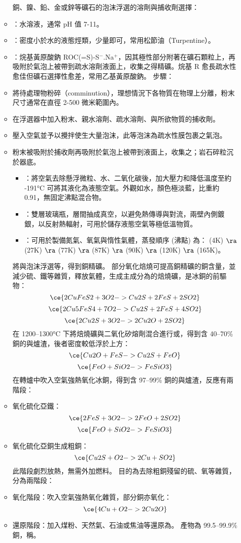 \documentclass[a4paper,12pt]{report}
\begin{document}
\begin{itemize}
\begin{itemize}
銅、鎳、鉛、金或鋅等礦石的泡沫浮選的溶劑與捕收劑選擇：
\bit
\item {}：水溶液，通常 pH 值 7-11。
\item {}：密度小於水的液態烴類，少量即可，常用松節油（Turpentine）。
\item {}：烷基黃原酸鈉 ROC(=S)-S$^-$.Na$^+$，因其極性部分附著在礦石顆粒上，再吸附於氣泡上被帶到疏水溶劑液面上，收集之得精礦。烷基 R 愈長疏水性愈佳但礦石選擇性愈差，常用乙基黃原酸鈉。
\eit
步驟：
\ben
\item 將待處理物粉碎（comminution），理想情況下各物質在物理上分離，粉末尺寸通常在直徑 2-500 微米範圍內。
\item 在浮選器中加入粉末、親水溶劑、疏水溶劑、與所欲物質的捕收劑。
\item 壓入空氣並予以攪拌使生大量泡沫，此等泡沫為疏水性膜包裹之氣泡。
\item 粉末被吸附於捕收劑再吸附於氣泡上被帶到液面上，收集之；岩石碎粒沉於器底。
\een
{}
\begin{itemize}
\item {}：將空氣去除懸浮微粒、水、二氧化碳後，加大壓力和降低溫度至約 -191°C 可將其液化為液態空氣。外觀如水，顏色極淡藍，比重約 0.91，無固定沸點混合物。
\item {}：雙層玻璃瓶，層間抽成真空，以避免熱傳導與對流，兩壁內側鍍銀，以反射熱輻射，可用於儲存液態空氣等極低溫物質。
\item {}：可用於製備氮氣、氧氣與惰性氣體，蒸發順序 (沸點) 為： (4K) $\ra$ (27K) $\ra$ (77K) $\ra$ (87K) $\ra$ (90K) $\ra$ (120K) $\ra$ (165K)。
\end{itemize}
將與泡沫浮選等，得到銅精礦。
部分氧化焙燒可提高銅精礦的銅含量，並減少硫、鐵等雜質，釋放氣體，生成主成分為的焙燒礦，是冰銅的前驅物：
\[\ce{2CuFeS2 + 3O2 -> Cu2S + 2FeS + 2SO2}\]
\[\ce{2Cu5FeS4 + 7O2 -> Cu2S + 2FeS + 4SO2}\]
\[\ce{2Cu2S + 3O2 -> 2Cu2O + 2SO2}\]
在 1200–1300°C 下將焙燒礦與二氧化矽熔劑混合進行或，得到含 40–70\% 銅的與爐渣，後者密度較低浮於上方：
\[\ce{Cu2O + FeS -> Cu2S + FeO}\]
\[\ce{FeO + SiO2 -> FeSiO3}\]
在轉爐中吹入空氣強熱氧化冰銅，得到含 97–99\% 銅的與爐渣，反應有兩階段：
\ben
\item 氧化硫化亞鐵：
\[\ce{2FeS + 3O2 -> 2FeO + 2SO2}\]
\[\ce{FeO + SiO2 -> FeSiO3}\]
\item 氧化硫化亞銅生成粗銅：  
\[\ce{Cu2S + O2 -> 2Cu + SO2}\]
此階段劇烈放熱，無需外加燃料。
\een
{}
目的為去除粗銅殘留的硫、氧等雜質，分為兩階段：
\ben
\item 氧化階段：吹入空氣強熱氧化雜質，部分銅亦氧化：
\[\ce{4Cu + O2 -> 2Cu2O}\]
\item 還原階段：加入煤粉、天然氣、石油或焦油等還原為。
\een
產物為 99.5–99.9\% 銅，稱。

\end{itemize}
\end{itemize}
\end{document}
